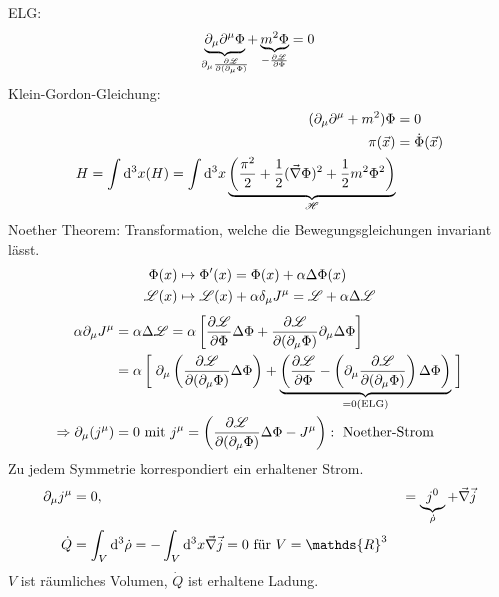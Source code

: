 	ELG:
		\begin{align*}
			\underbrace{\partial_\mu \partial^\mu \Phi}_{\mathclap{\partial_\mu \frac{\partial \La}{\partial(\partial_\mu \Phi)}}} + \underbrace{m^2 \Phi}_{\mathclap{-\frac{\partial \La}{\partial\Phi}}} = 0 \\
		\end{align*}
	Klein-Gordon-Gleichung:
		\begin{align*}
			(\partial_\mu \partial^\mu + m^2) \Phi &= 0 \\
			\pi(\vec{x}) &= \dot{\Phi}(\vec{x}) \\
			H = \int \diff^3 x \mathscr(H) = 
			\int \diff^3 x \underbrace{\left(
				\frac{\pi^2}{2} + \frac{1}{2}(\vec{\nabla} \Phi)^2 + \frac{1}{2}m^2 \Phi^2
			\right)}_{\mathclap{\mathscr{H}}}
		\end{align*}
	Noether Theorem: Transformation, welche die Bewegungsgleichungen invariant lässt.
		\begin{align*}
			\Phi(x) &\mapsto \Phi' (x) = \Phi (x) + \alpha \Delta \Phi (x) \\
			\mathscr{L}(x) &\mapsto \mathscr{L}(x) + \alpha \delta_\mu J^\mu = \mathscr{L} + \alpha \Delta \mathscr{L}
		\end{align*}
		\begin{align*}
			\alpha \partial_\mu J^\mu &= \alpha \Delta \La = 
			\alpha \left[
				\frac{\partial \La}{\partial \Phi} \Delta \Phi + 
				\frac{\partial \La}{\partial(\partial_\mu \Phi)} \partial_\mu \Delta \Phi
			\right] \\
			&= \alpha \left[ \vphantom{\partial_\mu \left(
				\frac{\partial \La}{\partial (\partial_\mu \Phi)} \Delta \Phi
				\right)} \right.
				\partial_\mu \left(
					\frac{\partial \La}{\partial (\partial_\mu \Phi)} \Delta \Phi
				\right)
				+ \underbrace{\left(
					\frac{\partial \La}{\partial \Phi} - \left(
						\partial_\mu \frac{\partial \La}{\partial(\partial_\mu \Phi)}
					\right)	\Delta \Phi			
				\right)}_{\mathclap{= 0 (\text{ELG})}}
				\left.\vphantom{\partial_\mu \left(
				\frac{\partial \La}{\partial (\partial_\mu \Phi)} \Delta \Phi
				\right)
			}\right] \\
			\Rightarrow \partial_\mu (j^\mu) &= 0 \text{ mit }
			j^\mu = \left(
				\frac{\partial \La}{\partial (\partial_\mu \Phi)} \Delta \Phi - J^\mu
			\right): \text{ Noether-Strom}
		\end{align*}
	Zu jedem Symmetrie korrespondiert ein erhaltener Strom.
		\begin{align*}
			\partial_\mu j^\mu &= 0,& &= \underbrace{j^0}_{\mathclap{\dot{\rho}}} + \vec{\nabla} \vec{j}  \\
			\dot{Q} &= \int_V \diff^3 \dot{\rho} = -\int_V \diff^3 x \vec{\nabla} \vec{j} = 0 \text{ für } V= \mathds{R}^3
		\end{align*}
	$V$ ist räumliches Volumen, $\dot{Q}$ ist erhaltene Ladung.
	
